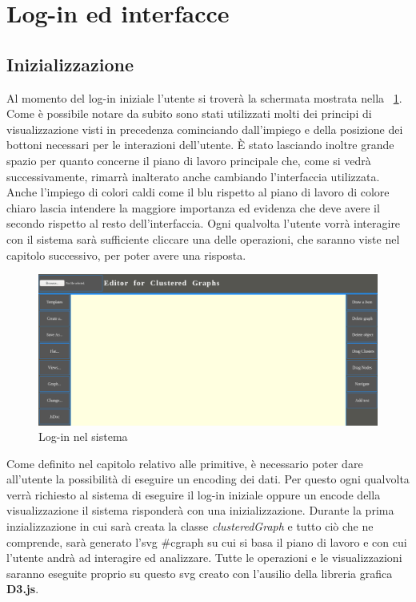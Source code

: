 {\section{Log-in ed interfacce}
	\subsection{Inizializzazione}
Al momento del log-in iniziale l'utente si troverà la schermata mostrata nella \figurename~\ref{fig:interfaccia}. Come è possibile notare da subito sono stati utilizzati molti dei principi di visualizzazione visti in precedenza cominciando dall'impiego e della posizione dei bottoni necessari per le interazioni dell'utente. È stato lasciando inoltre grande spazio per quanto concerne il piano di lavoro principale che, come si vedrà successivamente, rimarrà inalterato anche cambiando l'interfaccia utilizzata. Anche l'impiego di colori caldi come il blu rispetto al piano di lavoro di colore chiaro lascia intendere la maggiore importanza ed evidenza che deve avere il secondo rispetto al resto dell'interfaccia. Ogni qualvolta l'utente vorrà interagire con il sistema sarà sufficiente cliccare una delle operazioni, che saranno viste nel capitolo successivo, per poter avere una risposta.
\begin{figure}[!htb]
	\begin{center}
		\includegraphics[width=1 \linewidth]{figure/interfaccia}
	\end{center}
	\caption{Log-in nel sistema\label{fig:interfaccia}}
\end{figure}
Come definito nel capitolo relativo alle primitive, è necessario poter dare all'utente la possibilità di eseguire un encoding dei dati. Per questo ogni qualvolta verrà richiesto al sistema di eseguire il log-in iniziale oppure un encode della visualizzazione il sistema risponderà con una inizializzazione. Durante la prima inzializzazione in cui sarà creata la classe \textit{clusteredGraph} e tutto ciò che ne comprende, sarà generato l'svg \#cgraph su cui si basa il piano di lavoro e con cui l'utente andrà ad interagire ed analizzare. Tutte le operazioni e le visualizzazioni saranno eseguite proprio su questo svg creato con l'ausilio della libreria grafica\textbf{ D3.js}.\\
}
